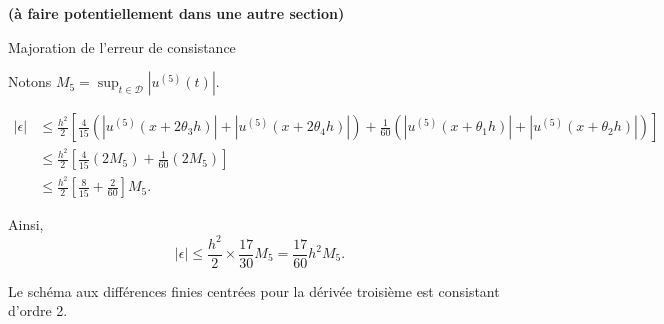 \documentclass[12pt,a4paper]{article}
\begin{document}
\vspace{5cm}
\textbf{(à faire potentiellement dans une autre section)}

Majoration de l'erreur de consistance 

Notons $M_5 = \sup_{t \in \mathcal{D}} |u^{(5)}(t)|$.

\begin{align*}
|\epsilon| &\leq \frac{h^2}{2} \left[ \frac{4}{15} \left( |u^{(5)}(x+2\theta_3 h)| + |u^{(5)}(x+2\theta_4 h)| \right) + \frac{1}{60} \left( |u^{(5)}(x+\theta_1 h)| + |u^{(5)}(x+\theta_2 h)| \right) \right] \\
&\leq \frac{h^2}{2} \left[ \frac{4}{15} (2 M_5) + \frac{1}{60} (2 M_5) \right] \\
&\leq \frac{h^2}{2} \left[ \frac{8}{15} + \frac{2}{60} \right] M_5.
\end{align*}


Ainsi, 
\begin{equation}
|\epsilon| \leq \frac{h^2}{2} \times \frac{17}{30} M_5 = \frac{17}{60} h^2 M_5.
\end{equation}

Le schéma aux différences finies centrées pour la dérivée troisième est consistant d'ordre 2. 
\end{document}
